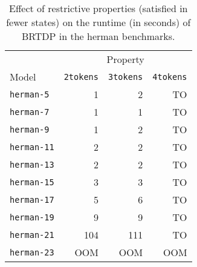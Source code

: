 \begin{table}[t]
\centering
\caption{Effect of restrictive properties (satisfied in fewer states) on the runtime (in seconds) of BRTDP in the herman benchmarks.}
\label{tab:herman-brtdp}
\setlength{\tabcolsep}{10pt} %
\begin{tabular}{@{}lrrr@{}}
	\toprule
	& \multicolumn{3}{c}{Property}\\
	\cmidrule(l){2-4}
Model                & \texttt{2tokens} & \texttt{3tokens} & \texttt{4tokens} \\
\midrule
\texttt{herman-5} & 1                  & 2                     & TO                   \\
\texttt{herman-7} & 1                  & 1                     & TO                   \\
\texttt{herman-9} & 1                  & 2                     & TO                   \\
\texttt{herman-11} & 2                  & 2                     & TO                   \\
\texttt{herman-13} & 2                  & 2                     & TO                   \\
\texttt{herman-15} & 3                  & 3                     & TO                   \\
\texttt{herman-17} & 5                  & 6                     & TO                   \\
\texttt{herman-19} & 9                   & 9                     & TO                   \\
\texttt{herman-21} & 104                 & 111                   & TO                   \\
\texttt{herman-23} & OOM                   & OOM                   & OOM                  
\\ \bottomrule
\end{tabular}
\end{table}
